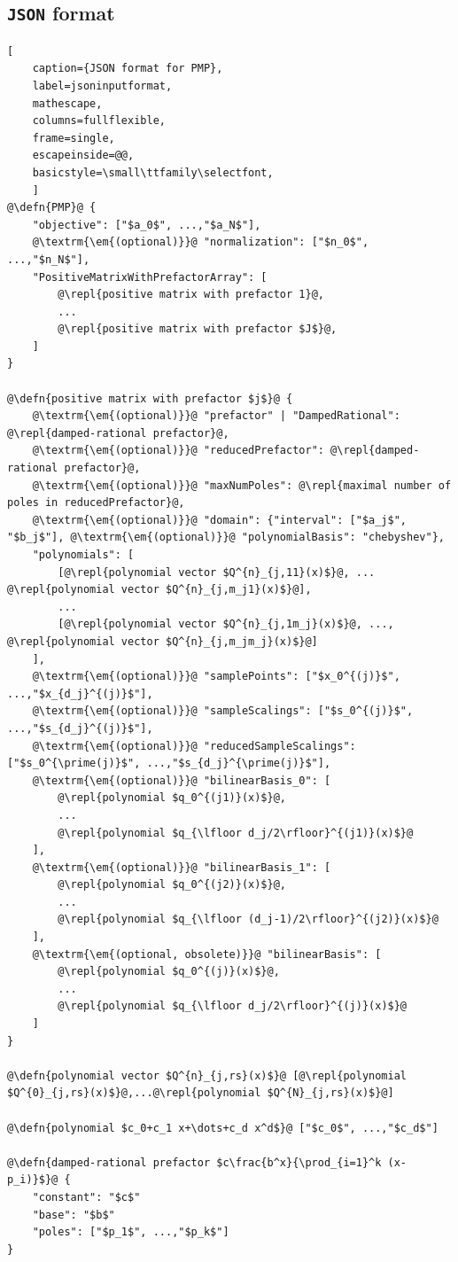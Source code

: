 \documentclass[12pt]{article}
\numberwithin{equation}{section}
\newcommand\repl[1]{$\langle$\textrm{\em #1}$\rangle$}
\newcommand\defn[1]{\textrm{\em #1}\ $\equiv$}
\begin{document}
\subsection{\texttt{JSON} format}
\begin{lstlisting}[
	caption={JSON format for PMP},
	label=jsoninputformat,
	mathescape,
	columns=fullflexible,
	frame=single,
	escapeinside=@@,
	basicstyle=\small\ttfamily\selectfont,
	]
@\defn{PMP}@ {
	"objective": ["$a_0$", ...,"$a_N$"],
	@\textrm{\em{(optional)}}@ "normalization": ["$n_0$", ...,"$n_N$"],
	"PositiveMatrixWithPrefactorArray": [
		@\repl{positive matrix with prefactor 1}@,
		...
		@\repl{positive matrix with prefactor $J$}@,
	]
}

@\defn{positive matrix with prefactor $j$}@ {
	@\textrm{\em{(optional)}}@ "prefactor" | "DampedRational": @\repl{damped-rational prefactor}@,
	@\textrm{\em{(optional)}}@ "reducedPrefactor": @\repl{damped-rational prefactor}@,
	@\textrm{\em{(optional)}}@ "maxNumPoles": @\repl{maximal number of poles in reducedPrefactor}@,
	@\textrm{\em{(optional)}}@ "domain": {"interval": ["$a_j$", "$b_j$"], @\textrm{\em{(optional)}}@ "polynomialBasis": "chebyshev"},
	"polynomials": [
		[@\repl{polynomial vector $Q^{n}_{j,11}(x)$}@, ... @\repl{polynomial vector $Q^{n}_{j,m_j1}(x)$}@],
		...
		[@\repl{polynomial vector $Q^{n}_{j,1m_j}(x)$}@, ..., @\repl{polynomial vector $Q^{n}_{j,m_jm_j}(x)$}@]
	],
	@\textrm{\em{(optional)}}@ "samplePoints": ["$x_0^{(j)}$", ...,"$x_{d_j}^{(j)}$"],
	@\textrm{\em{(optional)}}@ "sampleScalings": ["$s_0^{(j)}$", ...,"$s_{d_j}^{(j)}$"],
	@\textrm{\em{(optional)}}@ "reducedSampleScalings": ["$s_0^{\prime(j)}$", ...,"$s_{d_j}^{\prime(j)}$"],
	@\textrm{\em{(optional)}}@ "bilinearBasis_0": [
		@\repl{polynomial $q_0^{(j1)}(x)$}@,
		...
		@\repl{polynomial $q_{\lfloor d_j/2\rfloor}^{(j1)}(x)$}@
	],
	@\textrm{\em{(optional)}}@ "bilinearBasis_1": [
		@\repl{polynomial $q_0^{(j2)}(x)$}@,
		...
		@\repl{polynomial $q_{\lfloor (d_j-1)/2\rfloor}^{(j2)}(x)$}@
	],
	@\textrm{\em{(optional, obsolete)}}@ "bilinearBasis": [
		@\repl{polynomial $q_0^{(j)}(x)$}@,
		...
		@\repl{polynomial $q_{\lfloor d_j/2\rfloor}^{(j)}(x)$}@
	]
}
	
@\defn{polynomial vector $Q^{n}_{j,rs}(x)$}@ [@\repl{polynomial $Q^{0}_{j,rs}(x)$}@,...@\repl{polynomial $Q^{N}_{j,rs}(x)$}@]

@\defn{polynomial $c_0+c_1 x+\dots+c_d x^d$}@ ["$c_0$", ...,"$c_d$"]

@\defn{damped-rational prefactor $c\frac{b^x}{\prod_{i=1}^k (x-p_i)}$}@ {
	"constant": "$c$"
	"base": "$b$"
	"poles": ["$p_1$", ...,"$p_k$"]
}
\end{lstlisting}
\end{document}
